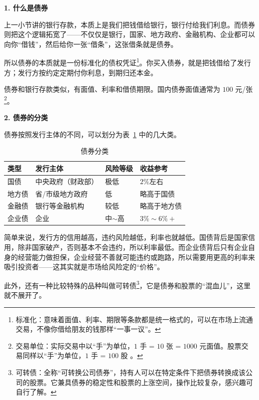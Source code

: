 \documentclass[12pt,openany]{book}
\newcommand{\subhead}[1]{%
    \par\vspace{0.5\baselineskip}%
    \noindent\textbf{#1}\par%
    \vspace{0.5\baselineskip}%
}
\begin{document}
\subhead{1. 什么是债券}

上一小节讲的银行存款，本质上是我们把钱借给银行，银行付给我们利息。而债券则把这个逻辑拓宽了——不仅仅是银行，国家、地方政府、金融机构、企业都可以向你“借钱”，然后给你一张“借条”，这张借条就是债券。

所以债券的本质就是一份标准化的债权凭证\footnote{标准化：意味着面值、利率、期限等条款都是统一格式的，可以在市场上流通交易，不像你借给朋友的钱那样“一事一议”。}。你买入债券，就是把钱借给了发行方；发行方按约定定期付你利息，到期归还本金。

债券和银行存款类似，有面值、利率和借债期限。国内债券面值通常为 $100$ 元/张\footnote{交易单位：实际交易中以“手”为单位，$1$ 手 = $10$ 张 = $1000$ 元面值。股票交易同样以“手”为单位，$1$ 手 = $100$ 股 。}。

\newpage

\subhead{2. 债券的分类}

债券按照发行主体的不同，可以划分为表~\ref{tab:bond_types} 中的几大类。

\begin{table}[tbp]
    \centering
    \small
    \singlespacing
    \renewcommand{\arraystretch}{1.25}
    \caption{债券分类}
    \label{tab:bond_types}
    \begin{tabularx}{\textwidth}{|>{\centering\arraybackslash\hsize=0.6\hsize}X|>{\centering\arraybackslash\hsize=1.3\hsize}X|>{\centering\arraybackslash\hsize=0.9\hsize}X|>{\centering\arraybackslash\hsize=1.2\hsize}X|}
        \hline
        类型 & 发行主体 & 风险等级 & 收益参考 \\ \hline
        国债 & 中央政府（财政部） & 极低 & $2\%$左右 \\ \hline
        地方债 & 省/市级地方政府 & 低 & 略高于国债 \\ \hline
        金融债 & 银行等金融机构 & 较低 & 略高于地方债 \\ \hline
        企业债 & 企业 & 中$\sim$高 & $3\%\sim 6\%+$ \\ \hline
    \end{tabularx}
\end{table}

简单来说，发行方的信用越高，违约风险越低，利率也就越低。国债背后是国家信用，除非国家破产，否则基本不会违约，所以利率最低。而企业债背后只有企业自身的经营能力做担保，企业经营不善就可能违约或跑路，所以需要用更高的利率来吸引投资者——这其实就是市场给风险定的“价格”。

此外，还有一种比较特殊的品种叫做可转债\footnote{可转债：全称“可转换公司债券”，持有人可以在特定条件下把债券转换成该公司的股票。它兼具债券的稳定性和股票的上涨空间，操作比较复杂，感兴趣可自行了解。}，它是债券和股票的“混血儿”，这里就不展开了。
\end{document}
